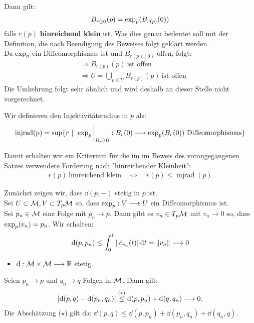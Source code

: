 \begin{bew}
Dann gilt:
\begin{align*}
B_{r(p)}(p)= \operatorname{exp}_p(B_{r(p)}(0))
\end{align*}
falls $r(p)$ \textbf{hinreichend klein} ist. Was dies genau bedeutet soll mit der Definition, die nach Beendigung des Beweises folgt geklärt werden. \\
Da $\operatorname{exp}_p$ ein Diffeomorphismus ist und $B_{r(p)(0)}$ offen, folgt:
\begin{align*}
&\Rightarrow B_{r(p)}(p) \ \text{ist offen} \\
&\Rightarrow U = \bigcup_{p \in U} B_{r(p)}(p) \ \text{ist offen}
\end{align*}
Die Umkehrung folgt sehr ähnlich und wird deshalb an dieser Stelle nicht vorgerechnet.
\end{bew} 
\begin{defs}[Injektivitätsradius]
Wir definieren den Injektivitätsradius in $p$ als: 
\begin{align}
\operatorname{injrad(p)} = \sup\{ r \ | \ \eval{\expp_p}_{B_r(0)}: B_r(0) \longrightarrow \expp_p(B_r(0)) \ \text{Diffeomorphismus}\}
\end{align}
\end{defs}
Damit erhalten wir ein Kriterium für die im im Beweis des vorangegangenen Satzes verwendete Forderung nach "hinreichender Kleinheit":
\begin{align}
r(p) \ \text{hinreichend klein} \quad \Leftrightarrow \quad r(p) \leq \operatorname{injrad}(p)
\end{align}

\begin{lem}
\end{lem}
\begin{bew}
Zunächst zeigen wir, dass $\dd(p,-)$ stetig in $p$ ist. \\
Sei $U \subset \mathcal{M}, V \subset T_p\mathcal{M}$ so, dass $\operatorname{exp}_p: V \longrightarrow U$ ein Diffeomorphismus ist. \\
Sei $p_n \in \mathcal{M}$ eine Folge mit $p_n \rightarrow p$. Dann gibt es $v_n \in T_p\mathcal{M}$ mit $v_n \rightarrow 0$ so, dass $\operatorname{exp}_p(v_n) = p_n$. Wir erhalten:
\begin{align*}
\dd(p, p_n) \leq \int_0^1 \norm{\dot{c}_{v_n}(t)} \dd t = \norm{v_n} \longrightarrow 0
\end{align*}
\end{bew}

\begin{itemize}
\item $\dd: \mathcal{M} \times \mathcal{M} \longrightarrow \mathbb{R} $ stetig.
\end{itemize}
Seien $p_n \rightarrow p$ und $q_n \rightarrow q$ Folgen in $\mathcal{M}$. Dann gilt:
\begin{align*}
\abs{\dd(p, q)- \dd(p_n, q_n)} \overset{(\star)}{\leq} \dd(p, p_n) + \dd(q, q_n) \longrightarrow 0.
\end{align*}
Die Abschätzung ($\star$) gilt da: $\dd(p, q) \leq \dd(p, p_n) + \dd(p_n,q_n) + \dd(q_n, q)$. 